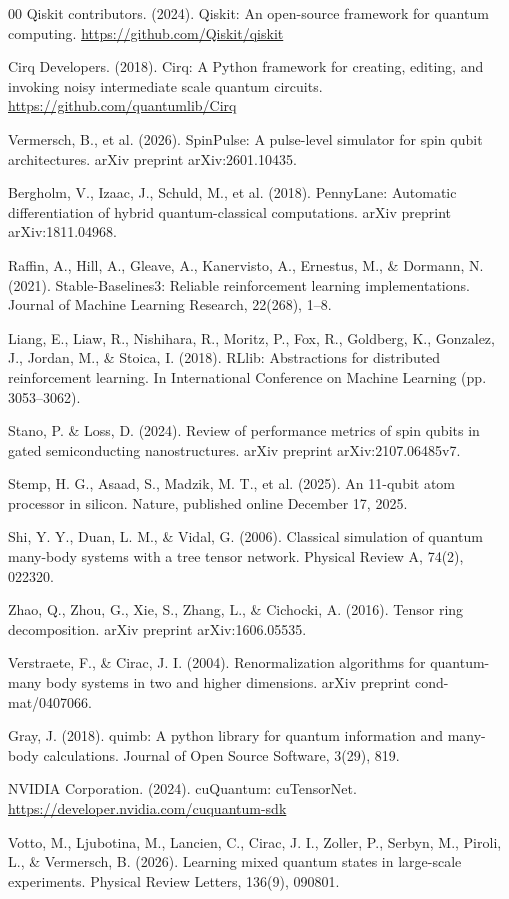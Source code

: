 \documentclass[preprint,12pt, a4paper]{elsarticle}
\begin{document}
\begin{thebibliography}{00}
 Qiskit contributors. (2024). Qiskit: An open-source framework for quantum computing. \url{https://github.com/Qiskit/qiskit}

 Cirq Developers. (2018). Cirq: A Python framework for creating, editing, and invoking noisy intermediate scale quantum circuits. \url{https://github.com/quantumlib/Cirq}

 Vermersch, B., et al. (2026). SpinPulse: A pulse-level simulator for spin qubit architectures. arXiv preprint arXiv:2601.10435.

 Bergholm, V., Izaac, J., Schuld, M., et al. (2018). PennyLane: Automatic differentiation of hybrid quantum-classical computations. arXiv preprint arXiv:1811.04968.

 Raffin, A., Hill, A., Gleave, A., Kanervisto, A., Ernestus, M., \& Dormann, N. (2021). Stable-Baselines3: Reliable reinforcement learning implementations. Journal of Machine Learning Research, 22(268), 1--8.

 Liang, E., Liaw, R., Nishihara, R., Moritz, P., Fox, R., Goldberg, K., Gonzalez, J., Jordan, M., \& Stoica, I. (2018). RLlib: Abstractions for distributed reinforcement learning. In International Conference on Machine Learning (pp. 3053--3062).

 Stano, P. \& Loss, D. (2024). Review of performance metrics of spin qubits in gated semiconducting nanostructures. arXiv preprint arXiv:2107.06485v7.

 Stemp, H. G., Asaad, S., Madzik, M. T., et al. (2025). An 11-qubit atom processor in silicon. Nature, published online December 17, 2025.

 Shi, Y. Y., Duan, L. M., \& Vidal, G. (2006). Classical simulation of quantum many-body systems with a tree tensor network. Physical Review A, 74(2), 022320.

 Zhao, Q., Zhou, G., Xie, S., Zhang, L., \& Cichocki, A. (2016). Tensor ring decomposition. arXiv preprint arXiv:1606.05535.

 Verstraete, F., \& Cirac, J. I. (2004). Renormalization algorithms for quantum-many body systems in two and higher dimensions. arXiv preprint cond-mat/0407066.

 Gray, J. (2018). quimb: A python library for quantum information and many-body calculations. Journal of Open Source Software, 3(29), 819.

 NVIDIA Corporation. (2024). cuQuantum: cuTensorNet. \url{https://developer.nvidia.com/cuquantum-sdk}

 Votto, M., Ljubotina, M., Lancien, C., Cirac, J. I., Zoller, P., Serbyn, M., Piroli, L., \& Vermersch, B. (2026). Learning mixed quantum states in large-scale experiments. Physical Review Letters, 136(9), 090801.

\end{thebibliography}
\end{document}
